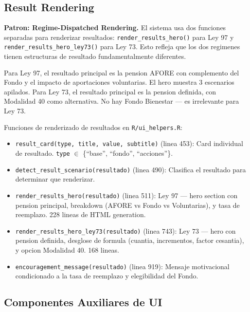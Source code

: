 \documentclass[11pt, letterpaper, twoside]{report}
\begin{document}
\subsection{Result Rendering}

\begin{patronbox}
\textbf{Patron: Regime-Dispatched Rendering.} El sistema usa dos funciones
separadas para renderizar resultados: \texttt{render\_results\_hero()} para Ley 97
y \texttt{render\_results\_hero\_ley73()} para Ley 73. Esto refleja que los dos
regimenes tienen estructuras de resultado fundamentalmente diferentes.
\end{patronbox}

\begin{intuicionbox}
Para Ley 97, el resultado principal es la pension AFORE con complemento del Fondo
y el impacto de aportaciones voluntarias. El hero muestra 3 escenarios apilados.
Para Ley 73, el resultado principal es la pension definida, con Modalidad 40 como
alternativa. No hay Fondo Bienestar --- es irrelevante para Ley 73.
\end{intuicionbox}

\begin{codigobox}
Funciones de renderizado de resultados en \texttt{R/ui\_helpers.R}:
\begin{itemize}[nosep]
\item \texttt{result\_card(type, title, value, subtitle)} (linea 453): Card individual
      de resultado. \texttt{type} $\in$ \{``base'', ``fondo'', ``acciones''\}.
\item \texttt{detect\_result\_scenario(resultado)} (linea 490): Clasifica el resultado
      para determinar que renderizar.
\item \texttt{render\_results\_hero(resultado)} (linea 511): Ley 97 --- hero section con
      pension principal, breakdown (AFORE vs Fondo vs Voluntarias), y tasa de reemplazo.
      228 lineas de HTML generation.
\item \texttt{render\_results\_hero\_ley73(resultado)} (linea 743): Ley 73 --- hero con
      pension definida, desglose de formula (cuantia, incrementos, factor cesantia),
      y opcion Modalidad 40. 168 lineas.
\item \texttt{encouragement\_message(resultado)} (linea 919): Mensaje motivacional
      condicionado a la tasa de reemplazo y elegibilidad del Fondo.
\end{itemize}
\end{codigobox}


\subsection{Componentes Auxiliares de UI}
\end{document}
